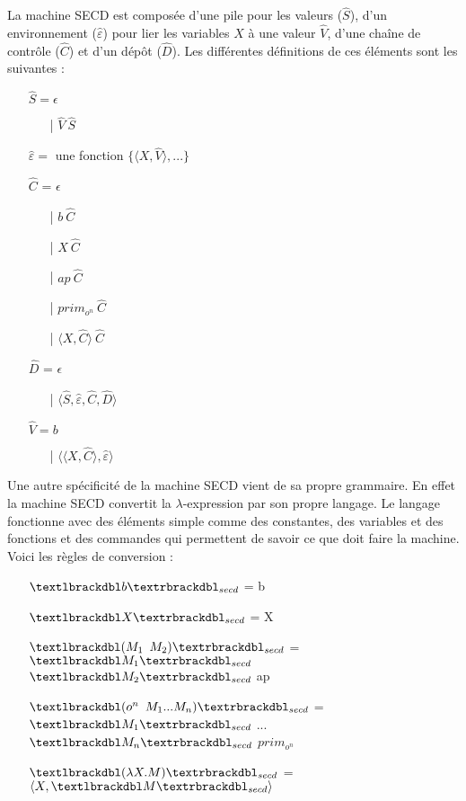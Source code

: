 \documentclass[10pt,a4paper]{report}
\begin{document}
La machine SECD est composée d'une pile pour les valeurs ($\widehat{S}$), d'un environnement ($\widehat{\varepsilon}$) pour lier les variables $X$ à une valeur $\widehat{V}$, d'une chaîne de contrôle ($\widehat{C}$) et d'un dépôt ($\widehat{D}$). Les différentes définitions de ces éléments sont les suivantes :
\smallbreak
\begin{itemize}
\item[] $\widehat{S} = \epsilon$ 
  \begin{itemize}
  \item[|] $\widehat{V}~\widehat{S}$
  \end{itemize}
\item[] $\widehat{\varepsilon} =$ une fonction $\{\langle X,\widehat{V}\rangle,...\}$
\item[] $\widehat{C}$ = $\epsilon$ 
  \begin{itemize}
  \item[|] $b~\widehat{C}$
  \item[|] $X~\widehat{C}$
  \item[|] $ap~\widehat{C}$
  \item[|] $prim_{o^{n}}~\widehat{C}$
  \item[|] $\langle X,\widehat{C}\rangle~\widehat{C}$
  \end{itemize}
\item[] $\widehat{D}$ = $\epsilon$
  \begin{itemize}
  \item[|] $\langle\widehat{S},\widehat{\varepsilon},\widehat{C},\widehat{D}\rangle$
  \end{itemize}
\item[] $\widehat{V} = b$
  \begin{itemize}
  \item[|] $\langle\langle X,\widehat{C}\rangle,\widehat{\varepsilon}\rangle$
  \end{itemize}
\end{itemize}
\bigbreak

Une autre spécificité de la machine SECD vient de sa propre grammaire. En effet la machine SECD convertit la $\lambda$-expression par son propre langage. Le langage fonctionne avec des éléments simple comme des constantes, des variables et des fonctions et des commandes qui permettent de savoir ce que doit faire la machine. Voici les règles de conversion :
\smallbreak

\begin{itemize}
\item[] $\textlbrackdbl b\textrbrackdbl _{secd}$ = b
\item[] $\textlbrackdbl X\textrbrackdbl _{secd}$ = X
\item[] $\textlbrackdbl (M_{1}$ $M_{2})\textrbrackdbl _{secd}$ = $\textlbrackdbl M_{1}\textrbrackdbl _{secd}$ $\textlbrackdbl M_{2}\textrbrackdbl _{secd}$ ap
\item[] $\textlbrackdbl (o^{n}$ $M_{1}...M_{n})\textrbrackdbl _{secd}$ = $\textlbrackdbl M_{1}\textrbrackdbl _{secd}$ $...$ $\textlbrackdbl M_{n}\textrbrackdbl _{secd}$ $prim_{o^{n}}$
\item[]  $\textlbrackdbl(\lambda X.M)\textrbrackdbl _{secd}$ =  $\langle X,\textlbrackdbl M\textrbrackdbl _{secd}\rangle$
\end{itemize}
\bigbreak
\end{document}
